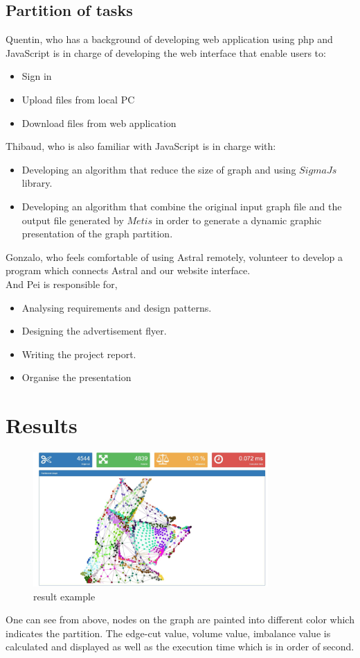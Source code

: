 \documentclass{cranfieldChart}
\begin{document}
\subsection{Partition of tasks} 
Quentin, who has a background of developing web application using php and JavaScript is in charge of developing the web interface that enable users to: 
\begin{itemize}
    \item Sign in 
    \item Upload files from local PC 
    \item Download files from web application 
\end{itemize}
Thibaud, who is also familiar with JavaScript is in charge with: 
\begin{itemize}
    \item Developing an algorithm that reduce the size of graph and using $SigmaJs$ library.
    \item Developing an algorithm that combine the original input graph file and the output file generated by $Metis$ in order to generate a dynamic graphic presentation of the graph partition. 
\end{itemize}
Gonzalo, who feels comfortable of using Astral remotely, volunteer to develop a program which connects Astral and our website interface. \\
And Pei is responsible for, 
\begin{itemize}
    \item Analysing requirements and design patterns. 
    \item Designing the advertisement flyer.
    \item Writing  the project report.
    \item Organise the presentation 
\end{itemize}

\section{Results}
\begin{figure}[h]
\centering
\includegraphics[width=0.8\textwidth]{ressources/graph}
\caption{result example}
\end{figure}
One can see from above, nodes on the graph are painted into different color which indicates the partition. The edge-cut value, volume value, imbalance value is calculated and displayed as well as the execution time which is in order of second. 
\end{document}
